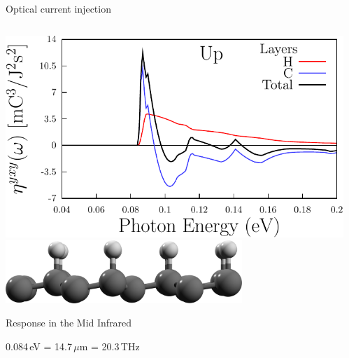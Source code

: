 \documentclass{beamer}
\begin{document}
\begin{frame}

\begin{center}
{\Large Optical current injection}
\end{center}

\begin{columns}

\begin{center}
\small 

\vspace{-1mm}
\includegraphics[width=1.0\textwidth]{figs/plots/eta-up_y.pdf}
\vspace{6mm}
\includegraphics[width=0.7\textwidth]{figs/up2.png}

\vspace{7mm}
Response in the Mid Infrared

0.084\,eV = 14.7\,$\mu$m = 20.3\,THz

\end{center}

\begin{center}
\small


\end{center}
\end{columns}
\end{frame}
\end{document}
